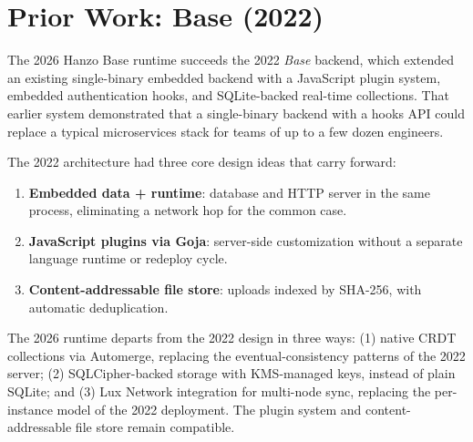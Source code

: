 \section{Prior Work: Base (2022)}
\label{sec:prior-work}

The 2026 Hanzo Base runtime succeeds the 2022 \emph{Base} backend, which extended an existing single-binary embedded backend with a JavaScript plugin system, embedded authentication hooks, and SQLite-backed real-time collections. That earlier system demonstrated that a single-binary backend with a hooks API could replace a typical microservices stack for teams of up to a few dozen engineers.

The 2022 architecture had three core design ideas that carry forward:
\begin{enumerate}
    \item \textbf{Embedded data + runtime}: database and HTTP server in the same process, eliminating a network hop for the common case.
    \item \textbf{JavaScript plugins via Goja}: server-side customization without a separate language runtime or redeploy cycle.
    \item \textbf{Content-addressable file store}: uploads indexed by SHA-256, with automatic deduplication.
\end{enumerate}

The 2026 runtime departs from the 2022 design in three ways: (1) native CRDT collections via Automerge, replacing the eventual-consistency patterns of the 2022 server; (2) SQLCipher-backed storage with KMS-managed keys, instead of plain SQLite; and (3) Lux Network integration for multi-node sync, replacing the per-instance model of the 2022 deployment. The plugin system and content-addressable file store remain compatible.

